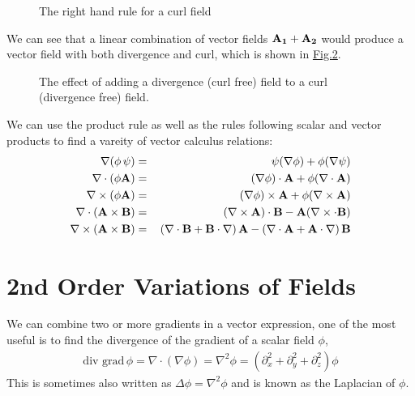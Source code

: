 \documentclass[letterpaper,10pt,english]{jupyterBook}
\begin{document}
\begin{figure}[htbp]
\centering
\capstart

\noindent{}
\caption{The right hand rule for a curl field}\label{\detokenize{VectorCalculus/divandcurl:righthandcurl}}\end{figure}

\sphinxAtStartPar
We can see that a linear combination of vector fields \(\bf A_1 + A_2\) would produce a vector field with both divergence and curl, which is shown in \hyperref[\detokenize{VectorCalculus/divandcurl:divcurl}]{Fig.\@ \ref{\detokenize{VectorCalculus/divandcurl:divcurl}}}.

\begin{figure}[htbp]
\centering
\capstart

\noindent{}
\caption{The effect of adding a divergence (curl free) field to a curl (divergence free) field.}\label{\detokenize{VectorCalculus/divandcurl:divcurl}}\end{figure}

\sphinxAtStartPar
We can use the product rule as well as the rules following scalar and vector products to find a vareity of vector calculus relations:
\begin{equation*}
\begin{split}\nabla(\phi\,\psi) &=&\, \psi(\nabla \phi) + \phi(\nabla \psi)\\
\nabla \cdot(\phi {\bf A}) &=&\, (\nabla \phi)\cdot {\bf A} + \phi(\nabla \cdot {\bf A})\\
\nabla \times(\phi {\bf A}) &=&\, (\nabla \phi)\times {\bf A} + \phi(\nabla \times {\bf A})\\
\nabla \cdot ({\bf A \times B}) &=&\, (\nabla \times {\bf A})\cdot {\bf B} - {\bf A}(\nabla \times\cdot {\bf B})\\
\nabla \times ({\bf A \times B}) &=&\, (\nabla \cdot {\bf B} + {\bf B}\cdot \nabla)\,{\bf A} - (\nabla \cdot {\bf A}+ {\bf A}\cdot \nabla)\,{\bf B}\end{split}
\end{equation*}

\section{2nd Order Variations of Fields}
\label{\detokenize{VectorCalculus/divandcurl:nd-order-variations-of-fields}}
\sphinxAtStartPar
We can combine two or more gradients in a vector expression, one of the most useful is to find the divergence of the gradient of a scalar field \(\phi\),
\begin{equation*}
\begin{split}\textrm{div grad} \,\phi = \nabla \cdot (\nabla \phi) = \nabla^2 \phi = (\partial_x^2 + \partial_y^2 + \partial_z^2)\phi\end{split}
\end{equation*}
\sphinxAtStartPar
This is sometimes also written as \(\Delta\phi = \nabla^2 \phi \) and is known as the Laplacian of \(\phi\).
\end{document}
